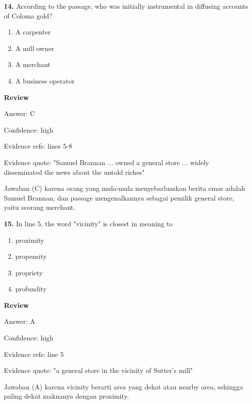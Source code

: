 \documentclass[12pt]{article}
\begin{document}
\endgroup
\par
\vspace{0.25\baselineskip}
\noindent\textbf{14.} According to the passage, who was initially instrumental in diffusing accounts of Coloma gold?
\begin{enumerate}[label=(\Alph*),leftmargin=*,itemsep=0.2em]
\item A carpenter
\item A mill owner
\item A merchant
\item A business operator
\end{enumerate}
\par
\begingroup
\setlength{\parskip}{0pt}
\setlength{\parindent}{0pt}
\textbf{Review}\par
Answer: C\par
Confidence: high\par
Evidence refs: lines 5-8\par
Evidence quote: "Samuel Brannan ... owned a general store ... widely disseminated the news about the untold riches"\par
Jawaban (C) karena orang yang mula-mula menyebarluaskan berita emas adalah Samuel Brannan, dan passage mengenalkannya sebagai pemilik general store, yaitu seorang merchant.\par
\endgroup
\par
\vspace{0.25\baselineskip}
\noindent\textbf{15.} In line 5, the word "vicinity" is closest in meaning to
\begin{enumerate}[label=(\Alph*),leftmargin=*,itemsep=0.2em]
\item proximity
\item propensity
\item propriety
\item profundity
\end{enumerate}
\par
\begingroup
\setlength{\parskip}{0pt}
\setlength{\parindent}{0pt}
\textbf{Review}\par
Answer: A\par
Confidence: high\par
Evidence refs: line 5\par
Evidence quote: "a general store in the vicinity of Sutter's mill"\par
Jawaban (A) karena vicinity berarti area yang dekat atau nearby area, sehingga paling dekat maknanya dengan proximity.\par
\endgroup
\par
\end{document}
